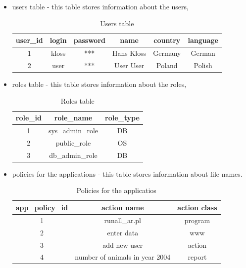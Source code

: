 \begin{itemize}
\item users table - this table stores information about the users,

\begin{table}[h]
\begin{center}\begin{tabular}{|c|c|c|c|c|c|}
\hline 
user\_id&login&password&name&country&language\tabularnewline
\hline
\hline
1&kloss&***&Hans Kloss&Germany&German\tabularnewline
\hline 
2&user&***&User User&Poland&Polish\tabularnewline
\hline 
\end{tabular}\end{center}
\caption{Users table}\label{Usertable1}
\end{table}

\item roles table - this table stores information about the roles,

\begin{table}[h]
\begin{center}\begin{tabular}{|c|c|c|}
\hline 
role\_id&role\_name&role\_type\tabularnewline
\hline 
1&sys\_admin\_role&DB\tabularnewline
\hline 
2&public\_role&OS\tabularnewline
\hline 
3&db\_admin\_role&DB\tabularnewline
\hline 
\end{tabular}\end{center}
\caption{Roles table}\label{rolestable1}
\end{table}

\item policies for the applications - this table stores information about file names.


\begin{center}%
\begin{table}[h]
\begin{center}\begin{tabular}{|c|c|c|}
\hline 
app\_policy\_id&
action name&
action class
\tabularnewline
\hline
\hline 
1&
runall\_ar.pl&
program
\tabularnewline
\hline 
2&
enter data&
www
\tabularnewline
\hline 
3&
add new user&
action
\tabularnewline
\hline 
4&
number of animals in year 2004&
report
\tabularnewline
\hline
\end{tabular}\end{center}
\caption{Policies for the applicatios}\label {policiestable1}
\end{table}
\end{center}
\end{itemize}

